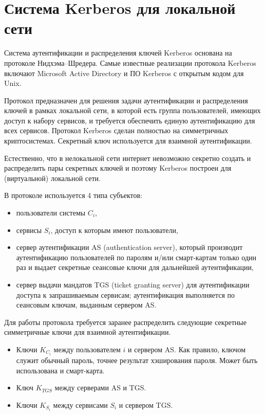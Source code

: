 \section{Система Kerberos для локальной сети}

Система аутентификации и распределения ключей Kerberos основана на протоколе Нидхэма--Шредера. Самые известные реализации протокола Kerberos включают Microsoft Active Directory и ПО Kerberos с открытым кодом для Unix.

Протокол предназначен для решения задачи аутентификации и распределения ключей в рамках локальной сети, в которой есть группа пользователей, имеющих доступ к набору сервисов, и требуется обеспечить единую аутентификацию для всех сервисов. Протокол Kerberos сделан полностью на симметричных криптосистемах. Секретный ключ используется для взаимной аутентификации.

Естественно, что в нелокальной сети интернет невозможно секретно создать и распределить пары секретных ключей и поэтому Kerberos построен для (виртуальной) локальной сети.

В протоколе используется 4 типа субъектов:

\begin{itemize}
    \item пользователи системы $C_i$,
    \item сервисы $S_i$, доступ к которым имеют пользователи,
    \item сервер аутентификации AS (authentication server), который производит аутентификацию пользователей по паролям и/или смарт-картам только один раз и выдает секретные сеансовые ключи для дальнейшей аутентификации,
    \item сервер выдачи мандатов TGS (ticket granting server) для аутентификации доступа к запрашиваемым сервисам; аутентификация выполняется по сеансовым ключам, выданным сервером AS.
\end{itemize}

Для работы протокола требуется заранее распределить следующие секретные симметричные ключи для взаимной аутентификации.
\begin{itemize}
    \item Ключи $K_{C_i}$ между пользователем $i$ и сервером AS. Как правило, ключом служит обычный пароль, точнее результат хэширования пароля. Может быть использована и смарт-карта.
    \item Ключ $K_{TGS}$ между серверами AS и TGS.
    \item Ключи $K_{S_i}$ между сервисами $S_i$ и сервером TGS.
\end{itemize}

